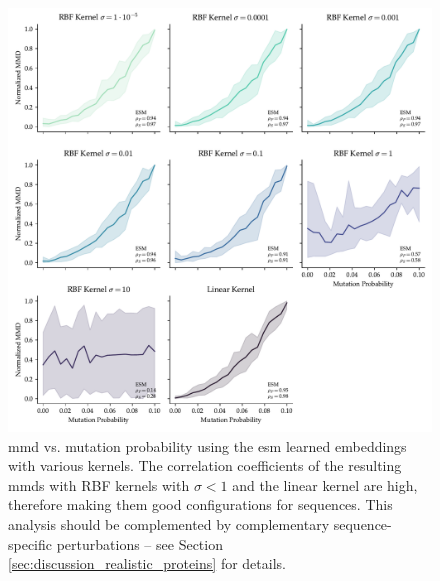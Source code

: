 \begin{figure}
  \centering
  \includegraphics[width=\textwidth]{./figures/results/res_5.pdf}
  \caption[\gls{mmd} using \acrshort{esm} embeddings.]{\gls{mmd} vs. mutation probability using the \acrshort{esm}
learned embeddings with various kernels. The correlation coefficients of the
resulting \gls{mmd}s with RBF kernels with $\sigma<1$ and the linear kernel are high,
therefore making them good configurations for sequences. This analysis should be
complemented by complementary sequence-specific perturbations -- see Section
\ref{sec:discussion_realistic_proteins} for details.}
  \label{fig:esm_descriptor}
\end{figure}

